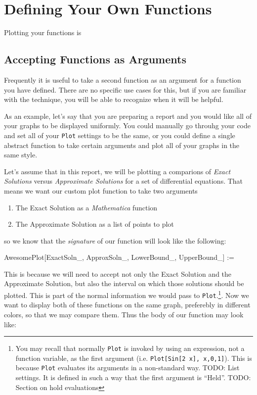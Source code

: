 \chapter{Defining Your Own Functions}
\label{chap:Functions}

Plotting your functions is 


\section{Accepting Functions as Arguments}

Frequently it is useful to take a second function as an argument for a function you have defined. There are no specific use cases for this, but if you are familiar with the technique, you will be able to recognize when it will be helpful.

As an example, let's say that you are preparing a report and you would like all of your graphs to be displayed uniformly. You could manually go throuhg your code and set all of your \texttt{Plot} settings to be the same, or you could define a single abstract function to take certain arguments and plot all of your graphs in the same style.

Let's assume that in this report, we will be plotting a comparions of \emph{Exact Solutions} versus \emph{Approximate Solutions} for a set of differential equations. That means we want our custom plot function to take two arguments
\begin{enumerate}
	   \item The Exact Solution as a \emph{Mathematica} function
	   \item The Approximate Solution as a list of points to plot
\end{enumerate}
so we know that the \emph{signature} of our function will look like the following:
\begin{code}
	   AwesomePlot[ExactSoln_, ApproxSoln_, LowerBound_, UpperBound_] :=
\end{code}

This is because we will need to accept not only the Exact Solution and the Approximate Solution, but also the interval on which those solutions should be plotted. This is part of the normal information we would pass to \texttt{Plot}.\footnote{You may recall that normally \texttt{Plot} is invoked by using an expression, not a function variable, as the first argument (i.e. \texttt{Plot[Sin[2 x], {x,0,1}]}). This is because \texttt{Plot} evaluates its arguments in a non-standard way. TODO: List settings. It is defined in such a way that the first argument is ``Held''. TODO: Section on hold evaluations}. Now we want to display both of these functions on the same graph, preferebly in different colors, so that we may compare them. Thus the body of our function may look like:

